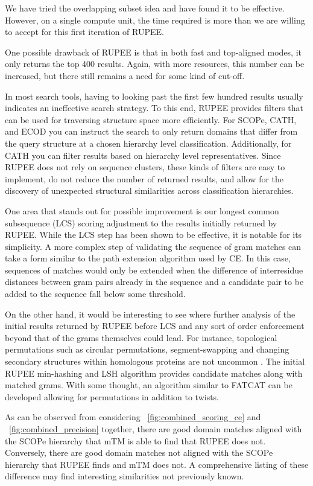 \documentclass[letter,center,fleqn]{NAR}
\begin{document}
We have tried the overlapping subset idea and have found it to be effective. 
However, on a single compute unit, the time required is more than we are willing to accept for this first iteration of RUPEE. 

One possible drawback of RUPEE is that in both fast and top-aligned modes, it only returns the top 400 results. 
Again, with more resources, this number can be increased, but there still remains a need for some kind of cut-off. 

In most search tools, having to looking past the first few hundred results usually indicates an ineffective search strategy.
To this end, RUPEE provides filters that can be used for traversing structure space more efficiently. 
For SCOPe, CATH, and ECOD you can instruct the search to only return domains that differ from the query structure at a chosen hierarchy level classification. 
Additionally, for CATH you can filter results based on hierarchy level representatives. 
Since RUPEE does not rely on sequence clusters, these kinds of filters are easy to implement, do not reduce the number of returned results, and allow for the discovery of unexpected structural similarities across classification hierarchies.  

One area that stands out for possible improvement is our longest common subsequence (LCS) scoring adjustment to the results initially returned by RUPEE. 
While the LCS step has been shown to be effective, it is notable for its simplicity. 
A more complex step of validating the sequence of gram matches can take a form similar to the path extension algorithm used by CE. 
In this case, sequences of matches would only be extended when the difference of interresidue distances between gram pairs already in the sequence and a candidate pair to be added to the sequence fall below some threshold.

On the other hand, it would be interesting to see where further analysis of the initial results returned by RUPEE before LCS and any sort of order enforcement beyond that of the grams themselves could lead. 
For instance, topological permutations such as circular permutations, segment-swapping and changing secondary structures within homologous proteins are not uncommon \cite{Andreeva2007}. 
The initial RUPEE min-hashing and LSH algorithm provides candidate matches along with matched grams. 
With some thought, an algorithm similar to FATCAT can be developed allowing for permutations in addition to twists. 

As can be observed from considering \figurename~\ref{fig:combined_scoring_ce} and \figurename~\ref{fig:combined_precision} together, there are good domain matches aligned with the SCOPe hierarchy that mTM is able to find that RUPEE does not. 
Conversely, there are good domain matches not aligned with the SCOPe hierarchy that RUPEE finds and mTM does not. 
A comprehensive listing of these difference may find interesting similarities not previously known. 
\end{document}
